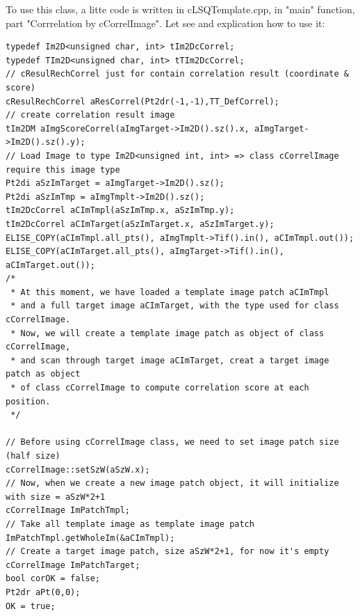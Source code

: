 \documentclass[twoside]{article}
\begin{document}
To use this class, a litte code is written in {\color{blue}cLSQTemplate.cpp}, in {\color{blue}"main"} function, part "Corrrelation by cCorrelImage". Let see and explication how to use it:
\begin{lstlisting}
typedef Im2D<unsigned char, int> tIm2DcCorrel;
typedef TIm2D<unsigned char, int> tTIm2DcCorrel;
// cResulRechCorrel just for contain correlation result (coordinate & score)
cResulRechCorrel aResCorrel(Pt2dr(-1,-1),TT_DefCorrel);
// create correlation result image
tIm2DM aImgScoreCorrel(aImgTarget->Im2D().sz().x, aImgTarget->Im2D().sz().y);
// Load Image to type Im2D<unsigned int, int> => class cCorrelImage require this image type
Pt2di aSzImTarget = aImgTarget->Im2D().sz();
Pt2di aSzImTmp = aImgTmplt->Im2D().sz();
tIm2DcCorrel aCImTmpl(aSzImTmp.x, aSzImTmp.y);
tIm2DcCorrel aCImTarget(aSzImTarget.x, aSzImTarget.y);
ELISE_COPY(aCImTmpl.all_pts(), aImgTmplt->Tif().in(), aCImTmpl.out());
ELISE_COPY(aCImTarget.all_pts(), aImgTarget->Tif().in(), aCImTarget.out());
/* 
 * At this moment, we have loaded a template image patch aCImTmpl
 * and a full target image aCImTarget, with the type used for class cCorrelImage.
 * Now, we will create a template image patch as object of class cCorrelImage,
 * and scan through target image aCImTarget, creat a target image patch as object   
 * of class cCorrelImage to compute correlation score at each position.
 */

// Before using cCorrelImage class, we need to set image patch size (half size)
cCorrelImage::setSzW(aSzW.x);  
// Now, when we create a new image patch object, it will initialize with size = aSzW*2+1
cCorrelImage ImPatchTmpl;
// Take all template image as template image patch
ImPatchTmpl.getWholeIm(&aCImTmpl);
// Create a target image patch, size aSzW*2+1, for now it's empty
cCorrelImage ImPatchTarget;
bool corOK = false;
Pt2dr aPt(0,0);
OK = true;


\end{lstlisting}
\end{document}
